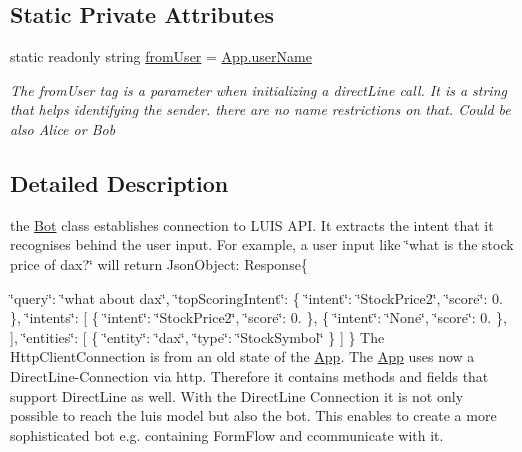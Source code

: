 \subsection*{Static Private Attributes}
\begin{DoxyCompactItemize}
\item 
static readonly string \hyperlink{class_listen_to_me_1_1_bot_adeb0c25a77e095d890c32da6f06ed669}{from\+User} = \hyperlink{class_listen_to_me_1_1_app_a8cb2cb11cbb86861f2e1a11840270bf0}{App.\+user\+Name}
\begin{DoxyCompactList}\small\item\em The from\+User tag is a parameter when initializing a direct\+Line call. It is a string that helps identifying the sender. there are no name restrictions on that. Could be also \textquotesingle{}Alice\textquotesingle{} or \textquotesingle{}Bob\textquotesingle{} \end{DoxyCompactList}\end{DoxyCompactItemize}


\subsection{Detailed Description}
the \hyperlink{class_listen_to_me_1_1_bot}{Bot} class establishes connection to L\+U\+IS A\+PI. It extracts the intent that it recognises behind the user input. For example, a user input like \char`\"{}what is the stock price of dax?\char`\"{} will return Json\+Object\+: Response\{ 

\char`\"{}query\char`\"{}\+: \char`\"{}what about dax\char`\"{}, \char`\"{}top\+Scoring\+Intent\char`\"{}\+: \{ \char`\"{}intent\char`\"{}\+: \char`\"{}\+Stock\+Price2\char`\"{}, \char`\"{}score\char`\"{}\+: 0. \}, \char`\"{}intents\char`\"{}\+: \mbox{[} \{ \char`\"{}intent\char`\"{}\+: \char`\"{}\+Stock\+Price2\char`\"{}, \char`\"{}score\char`\"{}\+: 0. \}, \{ \char`\"{}intent\char`\"{}\+: \char`\"{}\+None\char`\"{}, \char`\"{}score\char`\"{}\+: 0. \}, \mbox{]}, \char`\"{}entities\char`\"{}\+: \mbox{[} \{ \char`\"{}entity\char`\"{}\+: \char`\"{}dax\char`\"{}, \char`\"{}type\char`\"{}\+: \char`\"{}\+Stock\+Symbol\char`\"{} \} \mbox{]} \} The Http\+Client\+Connection is from an old state of the \hyperlink{class_listen_to_me_1_1_app}{App}. The \hyperlink{class_listen_to_me_1_1_app}{App} uses now a Direct\+Line-\/\+Connection via http. Therefore it contains methods and fields that support Direct\+Line as well. With the Direct\+Line Connection it is not only possible to reach the luis model but also the bot. This enables to create a more sophisticated bot e.\+g. containing Form\+Flow and ccommunicate with it. 


